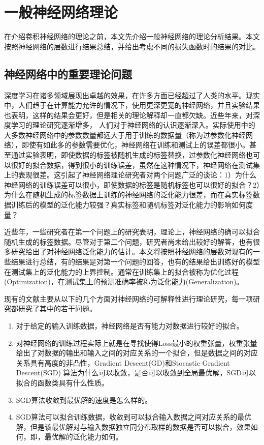 \chapter{一般神经网络理论}
在介绍卷积神经网络的理论之前，本文先介绍一般神经网络的理论分析结果。本文按照神经网络的层数进行结果总结，并给出考虑不同的损失函数时的结果的对比。

\section{神经网络中的重要理论问题}
深度学习在诸多领域展现出卓越的效果，在许多方面已经超过了人类的水平。现实中，人们趋于在计算能力允许的情况下，使用更深更宽的神经网络，并且实验结果也表明，这样的结果会更好，但是相关的理论解释却一直都欠缺。近些年来，对深度学习的理论研究逐渐增多，	人们对于神经网络的认识逐渐深入。实际使用中的大多数神经网络中的参数数量都远大于用于训练的数据量（称为过参数化神经网络），即使有如此多的参数需要优化，神经网络在训练和测试上的误差都很小。甚至\citet{zhang2016understanding}通过实验表明，即使数据的标签被随机生成的标签替换，过参数化神经网络也可以很好的拟合数据，得到很小的训练误差，虽然在这种情况下，神经网络在测试集上的表现很差。这引起了神经网络理论研究者对两个问题广泛的谈论：1）为什么神经网络的训练误差可以很小，即使数据的标签是随机标签也可以很好的拟合？2）为什么在随机生成的标签数据上训练的神经网络的泛化能力很差，而在真实标签数据训练后的模型的泛化能力较强？真实标签和随机标签对泛化能力的影响如何度量？
\par
近些年，一些研究者在第一个问题上的研究表明，理论上，神经网络的确可以拟合随机生成的标签数据\cite{du2018gradient,allen2018convergence,du2018gradient2,zou2018stochastic}。尽管对于第二个问题，研究者尚未给出较好的解答，也有很多研究给出了对神经网络泛化能力的估计。本文将按照神经网络的层数对现有的一些结果进行总结，有的结果是对第一个问题的回答，也有的结果给出训练好的模型在测试集上的泛化能力的上界控制。通常在训练集上的拟合被称为优化过程(Optimization)，在测试集上的预测准确率被称为泛化能力(Generalization)。
\par
现有的文献主要从以下的几个方面对神经网络的可解释性进行理论研究，每一项研究都研究了其中的若干问题。
\begin{enumerate}
  \item 对于给定的输入训练数据，神经网络是否有能力对数据进行较好的拟合。
  \item 对神经网络的训练过程实际上就是在寻找使得Loss最小的权重张量，权重张量给出了对数据的输出和输入之间的对应关系的一个拟合，但是数据之间的对应关系具有高度的非凸性，Gradient Descent(GD)和Stocastic Gradient Descent(SGD) 算法为什么可以收敛，是否可以收敛到全局最优解，SGD可以拟合的函数类具有什么性质。
  \item SGD算法收敛到最优解的速度是怎么样的。
  \item SGD算法可以拟合训练数据，收敛到可以拟合输入数据之间对应关系的最优解，但是该最优解对与输入数据独立同分布取样的数据是否可以拟合，效果如何，即，最优解的泛化能力如何。
\end{enumerate}


